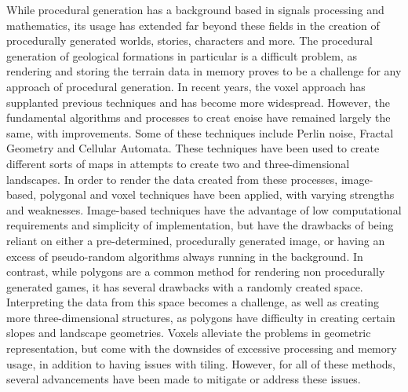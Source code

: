 \documentclass[10pt]{report}
\begin{document}
		While procedural generation has a background based in signals processing and mathematics, its usage has extended far beyond these fields in the creation of procedurally generated worlds, stories, characters and more. The procedural generation of geological formations in particular is a difficult problem, as rendering and storing the terrain data in memory proves to be a challenge for any approach of procedural generation. In recent years, the voxel approach has supplanted previous techniques and has become more widespread. However, the fundamental algorithms and processes to creat enoise have remained largely the same, with improvements. Some of these techniques include Perlin noise, Fractal Geometry and Cellular Automata. These techniques have been used to create different sorts of maps in attempts to create two and three-dimensional landscapes. In order to render the data created from these processes, image-based, polygonal and voxel techniques have been applied, with varying strengths and weaknesses. Image-based techniques have the advantage of low computational requirements and simplicity of implementation, but have the drawbacks of being reliant on either a pre-determined, procedurally generated image, or having an excess of pseudo-random algorithms always running in the background. In contrast, while polygons are a common method for rendering non procedurally generated games, it has several drawbacks with a randomly created space. Interpreting the data from this space becomes a challenge, as well as creating more three-dimensional structures, as polygons have difficulty in creating certain slopes and landscape geometries. Voxels alleviate the problems in geometric representation, but come with the downsides of excessive processing and memory usage, in addition to having issues with tiling. However, for all of these methods, several advancements have been made to mitigate or address these issues. 
	
	\newpage
	\renewcommand{\bibname}{References}
	
		
\end{document}
